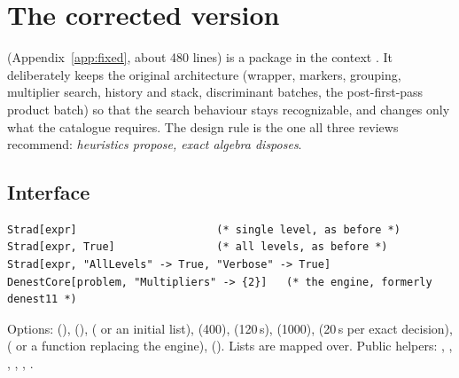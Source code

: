 \section{The corrected version}
\label{sec:corrected}
 (Appendix~\ref{app:fixed}, about 480 lines)
is a package in the context . It deliberately keeps the
original architecture (wrapper, markers, grouping, multiplier search,
history and stack, discriminant batches, the post-first-pass product batch)
so that the search behaviour stays recognizable, and changes only what the
catalogue requires. The design rule is the one all three reviews recommend:
\emph{heuristics propose, exact algebra disposes}.

\subsection{Interface}
\begin{lstlisting}
Strad[expr]                      (* single level, as before *)
Strad[expr, True]                (* all levels, as before *)
Strad[expr, "AllLevels" -> True, "Verbose" -> True]
DenestCore[problem, "Multipliers" -> {2}]   (* the engine, formerly denest11 *)
\end{lstlisting}
Options:  (),  (),
 ( or an initial list),
 (400),  (120\,s), 
(1000),  (20\,s per exact decision), 
( or a function replacing the engine), 
(). Lists are mapped over. Public helpers:
, , ,
, , .

